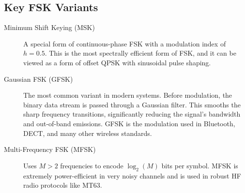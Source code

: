 \subsection{Key FSK Variants}

\begin{description}
    \item[Minimum Shift Keying (MSK)] A special form of continuous-phase FSK with a modulation index of $h=0.5$. This is the most spectrally efficient form of FSK, and it can be viewed as a form of offset QPSK with sinusoidal pulse shaping.
    \item[Gaussian FSK (GFSK)] The most common variant in modern systems. Before modulation, the binary data stream is passed through a Gaussian filter. This smooths the sharp frequency transitions, significantly reducing the signal's bandwidth and out-of-band emissions. GFSK is the modulation used in Bluetooth, DECT, and many other wireless standards.
    \item[Multi-Frequency FSK (MFSK)] Uses $M>2$ frequencies to encode $\log_2(M)$ bits per symbol. MFSK is extremely power-efficient in very noisy channels and is used in robust HF radio protocols like MT63.
\end{description}


